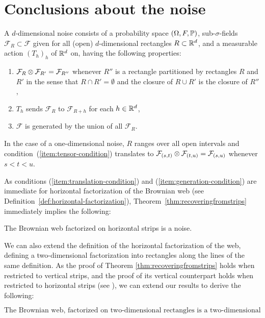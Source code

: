{
\section{Conclusions about the noise}

\newcommand{\F}{\mathcal{F}}
A $d$-dimensional noise consists of a probability space $(\Omega,F, \P)$, sub-$\sigma$-fields $\F_R \subset \F$ given for
all (open) $d$-dimensional rectangles $R \subset \R^d$, and a measurable action $(T_h)_h$ of $\R^d$ on, having the following
properties:
\begin{enumerate}
\item \label{item:tensor-condition} $\F_R \tensor \F_{R'} = \F_{R''}$ whenever $R''$ is a
rectangle partitioned by rectangles $R$ and $R'$ in the sense that
$R\cap R'=\emptyset$ and the closure of $R \cup R'$
is the closure of $R''$,
\item \label{item:translation-condition} $T_h$ sends $\F_R$ to $\F_{R+h}$ for each $h \in \R^d$,
\item \label{item:generation-condition} $\F$ is generated by the union of all $\F_R$.
\end{enumerate}

In the case of a one-dimensional noise, $R$ ranges over all open intervals
and condition~(\ref{item:tensor-condition}) translates to
$\F_{(s,t)} \tensor \F_{(t,u)} = \F_{(s,u)}$ whenever $s < t < u$.

As conditions (\ref{item:translation-condition}) and
(\ref{item:generation-condition}) are immediate for
horizontal factorization of the Brownian web (see
Definition~\ref{def:horizontal-factorization}),
Theorem~\ref{thm:recoveringfromstrips} immediately
implies the following:

\begin{theorem}
The Brownian web factorized on horizontal strips is a noise.
\end{theorem}

We can also extend the definition of the horizontal
factorization of the web, defining a two-dimensional
factorization into rectangles along the lines of the
same definition. As the proof of Theorem \ref{thm:recoveringfromstrips}
holds when restricted to vertical strips, and the proof of its vertical
counterpart holds when restricted to horizontal strips (see ), we can extend our results to derive the following:

\[\text{The Brownian web, factorized on two-dimensional
rectangles is a two-dimensional noise.}\]

}
